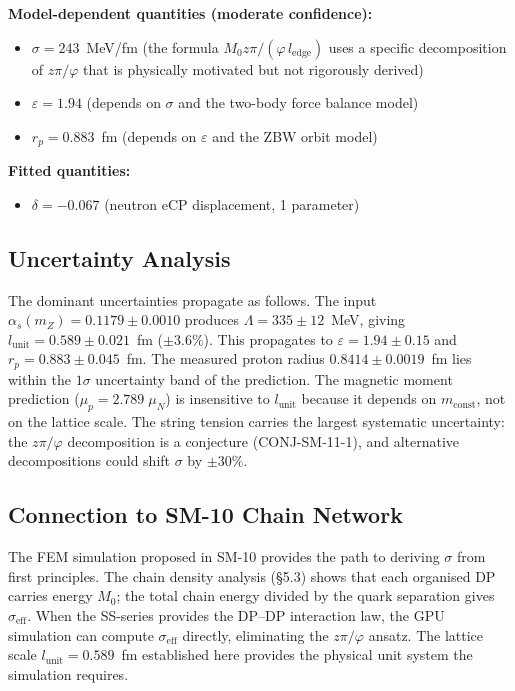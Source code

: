 \documentclass[12pt,a4paper]{article}
\begin{document}
\textbf{Model-dependent quantities (moderate confidence):}
\begin{itemize}
\item $\sigma = 243$~MeV/fm (the formula $M_0 z\pi/(\varphi\, l_{\mathrm{edge}})$ uses a specific decomposition of $z\pi/\varphi$ that is physically motivated but not rigorously derived)
\item $\varepsilon = 1.94$ (depends on $\sigma$ and the two-body force balance model)
\item $r_p = 0.883$~fm (depends on $\varepsilon$ and the ZBW orbit model)
\end{itemize}

\textbf{Fitted quantities:}
\begin{itemize}
\item $\delta = -0.067$ (neutron eCP displacement, 1 parameter)
\end{itemize}

\subsection{Uncertainty Analysis}

The dominant uncertainties propagate as follows. The input $\alpha_s(m_Z) = 0.1179 \pm 0.0010$ produces $\Lambda = 335 \pm 12$~MeV, giving $l_{\mathrm{unit}} = 0.589 \pm 0.021$~fm ($\pm 3.6\%$). This propagates to $\varepsilon = 1.94 \pm 0.15$ and $r_p = 0.883 \pm 0.045$~fm. The measured proton radius $0.8414 \pm 0.0019$~fm lies within the $1\sigma$ uncertainty band of the prediction. The magnetic moment prediction ($\mu_p = 2.789\;\mu_N$) is insensitive to $l_{\mathrm{unit}}$ because it depends on $m_{\mathrm{const}}$, not on the lattice scale. The string tension carries the largest systematic uncertainty: the $z\pi/\varphi$ decomposition is a conjecture (CONJ-SM-11-1), and alternative decompositions could shift $\sigma$ by $\pm 30\%$.

\subsection{Connection to SM-10 Chain Network}

The FEM simulation proposed in SM-10 provides the path to deriving $\sigma$ from first principles. The chain density analysis (\S5.3) shows that each organised DP carries energy $M_0$; the total chain energy divided by the quark separation gives $\sigma_{\mathrm{eff}}$. When the SS-series provides the DP--DP interaction law, the GPU simulation can compute $\sigma_{\mathrm{eff}}$ directly, eliminating the $z\pi/\varphi$ ansatz. The lattice scale $l_{\mathrm{unit}} = 0.589$~fm established here provides the physical unit system the simulation requires.
\end{document}
